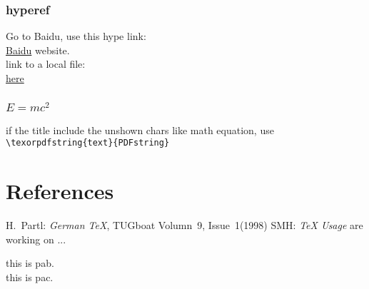 \documentclass[a4paper, 11pt, titlepage]{article}
\begin{document}
\subsubsection{hyperef}
Go to Baidu, use this hype link:\\
\href{www.baidu.com}{Baidu} website.\\
link to a local file:\\
\href{main.cpp}{here}\\

\subsubsection{\texorpdfstring{$E=mc^2$}{E=mc^2}}
if the title include the unshown chars like math equation, use \verb|\texorpdfstring{text}{PDFstring}|

\newpage
\appendix
\section{References}
\begin{thebibliography}{99}
 H.~Partl:
\emph{German \TeX}, TUGboat Volumn~9, Issue~1(1998)
 SMH:
\emph{\TeX{} Usage} are working on ...
\end{thebibliography}

 this is pab.\\
 this is pac.

\end{document}
